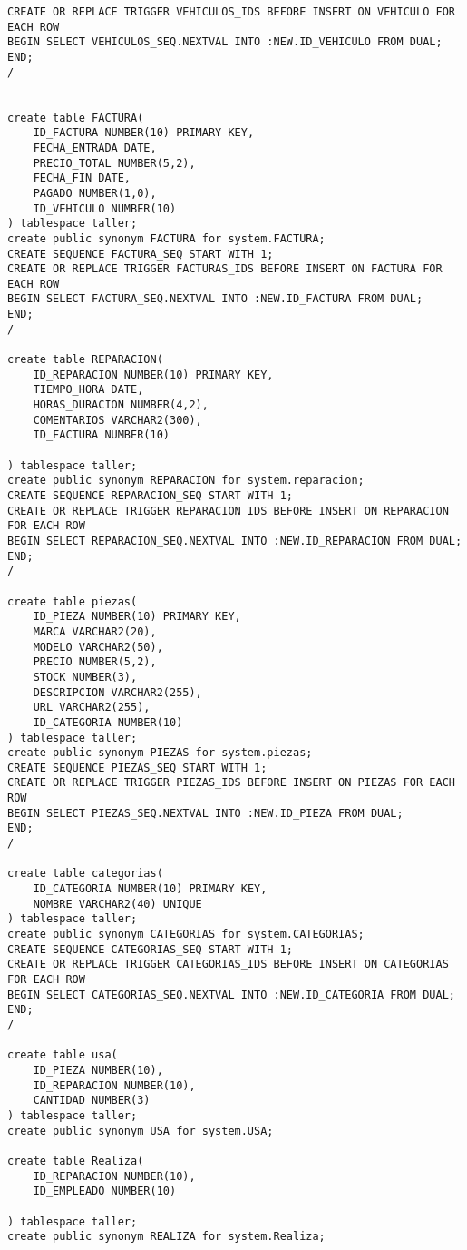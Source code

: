 \begin{lstlisting}
CREATE OR REPLACE TRIGGER VEHICULOS_IDS BEFORE INSERT ON VEHICULO FOR EACH ROW
BEGIN SELECT VEHICULOS_SEQ.NEXTVAL INTO :NEW.ID_VEHICULO FROM DUAL;
END;
/


create table FACTURA(
    ID_FACTURA NUMBER(10) PRIMARY KEY,
    FECHA_ENTRADA DATE,
    PRECIO_TOTAL NUMBER(5,2),
    FECHA_FIN DATE,
    PAGADO NUMBER(1,0),
    ID_VEHICULO NUMBER(10)
) tablespace taller;
create public synonym FACTURA for system.FACTURA;
CREATE SEQUENCE FACTURA_SEQ START WITH 1;
CREATE OR REPLACE TRIGGER FACTURAS_IDS BEFORE INSERT ON FACTURA FOR EACH ROW
BEGIN SELECT FACTURA_SEQ.NEXTVAL INTO :NEW.ID_FACTURA FROM DUAL;
END;
/

create table REPARACION(
    ID_REPARACION NUMBER(10) PRIMARY KEY,
    TIEMPO_HORA DATE,
    HORAS_DURACION NUMBER(4,2),
    COMENTARIOS VARCHAR2(300),
    ID_FACTURA NUMBER(10)

) tablespace taller;
create public synonym REPARACION for system.reparacion;
CREATE SEQUENCE REPARACION_SEQ START WITH 1;
CREATE OR REPLACE TRIGGER REPARACION_IDS BEFORE INSERT ON REPARACION FOR EACH ROW
BEGIN SELECT REPARACION_SEQ.NEXTVAL INTO :NEW.ID_REPARACION FROM DUAL;
END;
/

create table piezas(
    ID_PIEZA NUMBER(10) PRIMARY KEY,
    MARCA VARCHAR2(20),
    MODELO VARCHAR2(50),
    PRECIO NUMBER(5,2),
    STOCK NUMBER(3),
    DESCRIPCION VARCHAR2(255),
    URL VARCHAR2(255),
    ID_CATEGORIA NUMBER(10)
) tablespace taller;
create public synonym PIEZAS for system.piezas;
CREATE SEQUENCE PIEZAS_SEQ START WITH 1;
CREATE OR REPLACE TRIGGER PIEZAS_IDS BEFORE INSERT ON PIEZAS FOR EACH ROW
BEGIN SELECT PIEZAS_SEQ.NEXTVAL INTO :NEW.ID_PIEZA FROM DUAL;
END;
/

create table categorias(
    ID_CATEGORIA NUMBER(10) PRIMARY KEY,
    NOMBRE VARCHAR2(40) UNIQUE
) tablespace taller;
create public synonym CATEGORIAS for system.CATEGORIAS;
CREATE SEQUENCE CATEGORIAS_SEQ START WITH 1;
CREATE OR REPLACE TRIGGER CATEGORIAS_IDS BEFORE INSERT ON CATEGORIAS FOR EACH ROW
BEGIN SELECT CATEGORIAS_SEQ.NEXTVAL INTO :NEW.ID_CATEGORIA FROM DUAL;
END;
/

create table usa(
    ID_PIEZA NUMBER(10),
    ID_REPARACION NUMBER(10),
    CANTIDAD NUMBER(3)
) tablespace taller;
create public synonym USA for system.USA;

create table Realiza(
    ID_REPARACION NUMBER(10),
    ID_EMPLEADO NUMBER(10)

) tablespace taller;
create public synonym REALIZA for system.Realiza;


\end{lstlisting}
